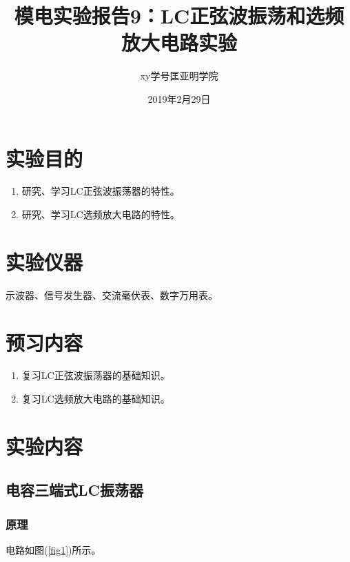 \documentclass[a4paper]{article}
\title{模电实验报告9：LC正弦波振荡和选频放大电路实验}
\author{xy\quad 学号\quad 匡亚明学院}
\date{2019年2月29日}
\begin{document}
\maketitle


\section{实验目的}
\begin{enumerate}
\item 研究、学习LC正弦波振荡器的特性。
\item 研究、学习LC选频放大电路的特性。
\end{enumerate}

\section{实验仪器}
示波器、信号发生器、交流毫伏表、数字万用表。

\section{预习内容}
\begin{enumerate}
\item 复习LC正弦波振荡器的基础知识。
\item 复习LC选频放大电路的基础知识。
\end{enumerate}

\section{实验内容}
\subsection{电容三端式LC振荡器}
\subsubsection{原理}
电路如图(\ref{fig1})所示。
\end{document}
